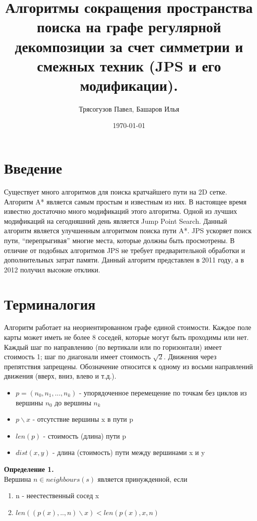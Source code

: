 \documentclass{physlab}
\begin{document}
%
\title{	Алгоритмы сокращения пространства поиска на графе регулярной декомпозиции за счет симметрии и смежных техник (JPS и его модификации).}
\author{Трясогузов Павел, Башаров Илья}
\date{\today}
\maketitle

\tableofcontents %


\section{Введение}
Существует много алгоритмов для поиска кратчайшего пути на 2D сетке. Алгоритм A* является самым простым и известным из них. В настоящее время известно достаточно много модификаций этого алгоритма. Одной из лучших модификаций на сегодняшний день является Jump Point Search. Данный алгоритм является улучшенным алгоритмом поиска пути A*. JPS ускоряет поиск пути, “перепрыгивая” многие места, которые должны быть просмотрены.  В отличие от подобных алгоритмов JPS не требует предварительной обработки и дополнительных затрат памяти. Данный алгоритм представлен в 2011 году, а в 2012 получил высокие отклики. \\


\section{Терминалогия}
Алгоритм работает на неориентированном графе единой стоимости. Каждое поле карты может иметь не более 8 соседей, которые могут быть проходимы или нет. Каждый шаг по направлению (по вертикали или по горизонтали) имеет стоимость 1; шаг по диагонали имеет стоимость $\sqrt{2}$. Движения через препятствия запрещены. Обозначение  относится к одному из восьми направлений движения (вверх, вниз, влево и т.д.). 
\begin{itemize}
    \item $p = (n_{0}, n_{1},...,n_{k})$ - упорядоченное перемещение по точкам без циклов из вершины $n_{0}$ до вершины $n_{k}$
    \item $p\backslash x$ - отсутствие вершины x в пути p
    \item $len(p)$ - стоимость (длина) пути p
    \item $dist(x, y)$ - длина (стоимость) пути между вершинами x и y

\end{itemize}
\textbf{Определение 1.} \\
Вершина $n \in neighbours(s)$ является принужденной, если 
\begin{enumerate}
    \item n - неестественный сосед x
    \item $len((p(x),..,n) \backslash x) < len(p(x), x, n)$
\end{enumerate}
\end{document}

